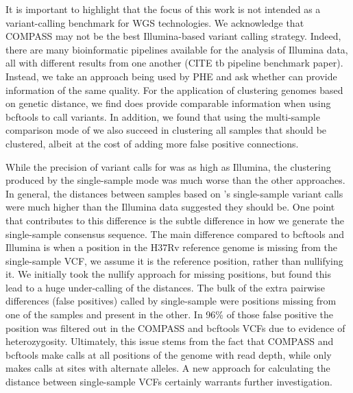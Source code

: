It is important to highlight that the focus of this work is not intended as a variant-calling benchmark for WGS technologies. We acknowledge that COMPASS may not be the best Illumina-based variant calling strategy. Indeed, there are many bioinformatic pipelines available for the analysis of \mtb{} Illumina data, all with different results from one another (CITE tb pipeline benchmark paper). Instead, we take an approach being used by PHE and ask whether \ont{} can provide information of the same quality. For the application of clustering genomes based on genetic distance, we find \ont{} does provide comparable information when using bcftools to call variants. In addition, we found that using the multi-sample comparison mode of \pandora{} we also succeed in clustering all samples that should be clustered, albeit at the cost of adding more false positive connections. 

While the precision of variant calls for \pandora{} was as high as Illumina, the clustering produced by the single-sample mode was much worse than the other approaches. In general, the distances between samples based on \pandora{}'s single-sample variant calls were much higher than the Illumina data suggested they should be. One point that contributes to this difference is the subtle difference in how we generate the \pandora{} single-sample consensus sequence. The main difference compared to bcftools and Illumina is when a position in the H37Rv reference genome is missing from the \pandora{} single-sample VCF, we assume it is the reference position, rather than nullifying it. We initially took the nullify approach for missing positions, but found this lead to a huge under-calling of the distances. The bulk of the extra pairwise differences (false positives) called by \pandora{} single-sample were positions missing from one of the samples and present in the other. In 96\% of those false positive the position was filtered out in the COMPASS and bcftools VCFs due to evidence of heterozygosity. Ultimately, this issue stems from the fact that COMPASS and bcftools make calls at all positions of the genome with read depth, while \pandora{} only makes calls at sites with alternate alleles. A new approach for calculating the distance between \pandora{} single-sample VCFs certainly warrants further investigation.

